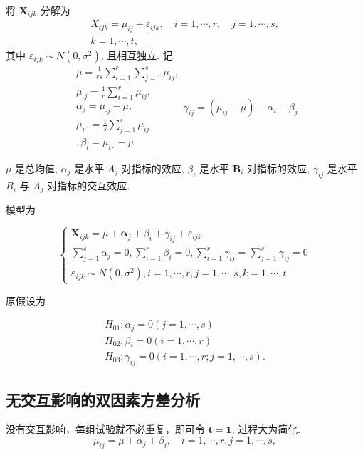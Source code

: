 将 \( \boldsymbol{X}_{i j k} \) 分解为
$$
\begin{array}{c}
X_{i j k}=\mu_{i j}+\varepsilon_{i j k}, \quad i=1, \cdots, r, \quad j=1, \cdots, s, \\
k=1, \cdots, t,
\end{array}
$$
其中 \( \varepsilon_{i j k} \sim N\left(0, \sigma^{2}\right) \), 且相互独立.  记
$$
\begin{array}{l}
\mu=\frac{1}{r s} \sum_{i=1}^{r} \sum_{j=1}^{s} \mu_{i j}, \\ \mu_{\cdot j}=\frac{1}{r} \sum_{i=1}^{r} \mu_{i j}, \\
 \alpha_{j}=\mu_{\cdot j}-\mu, \\
\mu_{i \cdot}=\frac{1}{s} \sum_{j=1}^{s} \mu_{i j} \\, 
 \beta_{i}=\mu_{i \cdot}-\mu
\end{array}
\gamma_{i j}=\left(\mu_{i j}-\mu\right)-\alpha_{i}-\beta_{j}
$$

\( \mu \) 是总均值, \( \alpha_{j} \) 是水平 \( A_{j} \) 对指标的效应, \( \beta_{i} \) 是水平 \( \boldsymbol{B}_{i} \)
对指标的效应, \( \gamma_{i j} \) 是水平 \( B_{i} \) 与 \( A_{j} \) 对指标的交互效应. 

模型为

$$ \left\{\begin{array}{l}\boldsymbol{X}_{i j k}=\mu+\boldsymbol{\alpha}_{j}+\beta_{i}+\gamma_{i j}+\varepsilon_{i j k} \\ \sum_{j=1}^{s} \alpha_{j}=0, \sum_{i=1}^{r} \beta_{i}=0, \sum_{i=1}^{r} \gamma_{i j}=\sum_{j=1}^{s} \gamma_{i j}=0 \\ \varepsilon_{i j k} \sim N\left(0, \sigma^{2}\right), i=1, \cdots, r, j=1, \cdots, s, k=1, \cdots, t\end{array}\right. $$

原假设为

$$
\begin{array}{l}
H_{01}: \alpha_{j}=0(j=1, \cdots, s) \\
H_{02}: \beta_{i}=0(i=1, \cdots, r) \\
H_{03}: \gamma_{i j}=0(i=1, \cdots, r ; j=1, \cdots, s) .
\end{array}
$$

\subsection{无交互影响的双因素方差分析}

没有交互影响，每组试验就不必重复，即可令 \( \boldsymbol{t}=\mathbf{1} \),
过程大为简化. 
$$
\mu_{i j}=\mu+\alpha_{j}+\beta_{i}, \quad i=1, \cdots, r, j=1, \cdots, s,
$$

